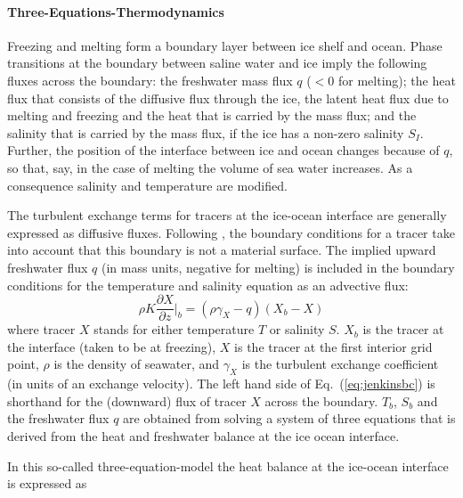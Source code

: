 \paragraph{Three-Equations-Thermodynamics}
\label{sec:pkg:shelfice:thermodynamics}

Freezing and melting form a boundary layer between ice shelf and
ocean. %
Phase transitions at the boundary between saline water and ice imply
the following fluxes across the boundary: the freshwater mass flux
$q$ ($<0$ for melting); the heat flux that consists of the diffusive
flux through the ice, the latent heat flux due to melting and freezing
and the heat that is carried by the mass flux; and the salinity that
is carried by the mass flux, if the ice has a non-zero salinity $S_I$.
Further, the position of the interface between ice and ocean changes
because of $q$, so that, say, in the case of melting the volume of sea
water increases. As a consequence salinity and temperature are
modified.

The turbulent exchange terms for tracers at the ice-ocean interface
are generally expressed as diffusive fluxes. Following
\citet{jenkins01}, the boundary conditions for a tracer take
into account that this boundary is not a material surface. 
The implied upward freshwater flux $q$ (in mass units, negative for
melting) is included in the boundary conditions for the temperature
and salinity equation as an advective flux:
\begin{equation}
  \label{eq:jenkinsbc}
  {\rho}K\frac{\partial{X}}{\partial{z}}\biggl|_{b} 
  = (\rho\gamma_{X}-q) ( X_{b} - X ) 
\end{equation}
where tracer $X$ stands for either temperature $T$ or salinity $S$.
$X_b$ is the tracer at the interface (taken to be at freezing), $X$ is
the tracer at the first interior grid point, $\rho$ is the density of
seawater, and $\gamma_X$ is the turbulent exchange coefficient (in
units of an exchange velocity). The left hand side of
Eq.~(\ref{eq:jenkinsbc}) is shorthand for the (downward) flux of tracer $X$
across the boundary. $T_b$, $S_b$ and the freshwater flux $q$ are
obtained from solving a system of three equations that is derived from
the heat and freshwater balance at the ice ocean interface.

In this so-called three-equation-model \citep[e.g.,][]{hellmer89,
  jenkins01} the heat balance at the ice-ocean interface is expressed
as

